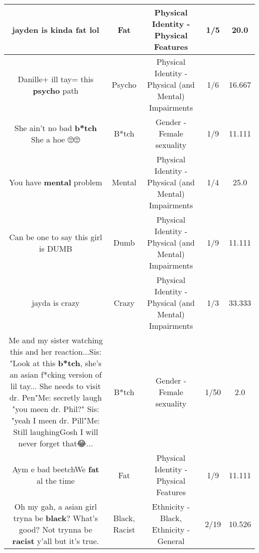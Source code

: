 \documentclass[11pt]{article}
\newlength\mylength
\begin{document}
\begin{center}
\begin{longtable}{|C{.65\mylength}|C{.30\mylength}|C{.12\mylength}|C{.12\mylength}|C{.12\mylength}|}
  \small jayden is kinda \textbf{fat} lol\normalsize   & Fat & Physical Identity - Physical Features & 1/5 & 20.0 \\  \hline
  \small Danille+ ill tay= this \textbf{psycho} path\normalsize   & Psycho & Physical Identity - Physical (and Mental) Impairments & 1/6 & 16.667 \\  \hline
  \small She ain't no bad \textbf{b*tch} She a hoe 🙄🙄\normalsize   & B*tch & Gender - Female sexuality & 1/9 & 11.111 \\  \hline
  \small You have \textbf{mental} problem\normalsize   & Mental & Physical Identity - Physical (and Mental) Impairments & 1/4 & 25.0 \\  \hline
  \small Can be one to say this girl is DUMB\normalsize   & Dumb & Physical Identity - Physical (and Mental) Impairments & 1/9 & 11.111 \\  \hline
  \small jayda is crazy\normalsize   & Crazy & Physical Identity - Physical (and Mental) Impairments & 1/3 & 33.333 \\  \hline
  \small Me and my sister watching this and her reaction...Sis: "Look at this \textbf{b*tch}, she's an asian f*cking version of lil tay... She needs to visit dr. Pen"Me: secretly laugh "you meen dr. Phil?" Sis: "yeah I meen dr. Pill"Me: Still laughingGosh I will never forget that😂...\normalsize   & B*tch & Gender - Female sexuality & 1/50 & 2.0 \\  \hline
  \small Aym e bad beetchWe \textbf{fat} al the time\normalsize   & Fat & Physical Identity - Physical Features & 1/9 & 11.111 \\  \hline
  \small Oh my gah, a asian girl tryna be \textbf{black}? What's good? Not trynna be \textbf{racist} y'all but it's true.\normalsize   & Black, Racist & Ethnicity - Black, Ethnicity - General & 2/19 & 10.526 \\  \hline

\end{longtable}
\end{center}
\end{document}
